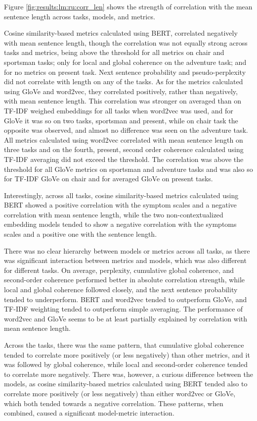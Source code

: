 Figure \ref{fig:results:lm:ru:corr_len} shows the strength of correlation with the mean sentence length across tasks, models, and metrics. 

Cosine similarity-based metrics calculated using BERT, correlated negatively with mean sentence length, though the correlation was not equally strong across tasks and metrics, being above the threshold for all metrics on chair and sportsman tasks; only for local and global coherence on the adventure task; and for no metrics on present task. Next sentence probability and pseudo-perplexity did not correlate with length on any of the tasks. 
As for the metrics calculated using GloVe and word2vec, they correlated positively, rather than negatively, with mean sentence length. This correlation was stronger on averaged than on TF-IDF weighed embeddings for all tasks when word2vec was used, and for GloVe it was so on two tasks, sportsman and present, while on chair task the opposite was observed, and almost no difference was seen on the adventure task. All metrics calculated using word2vec correlated with mean sentence length on three tasks and on the fourth, present, second order coherence calculated using TF-IDF averaging did not exceed the threshold. The correlation was above the threshold for all GloVe metrics on sportsman and adventure tasks and was also so for TF-IDF GloVe on chair and for averaged GloVe on present tasks.

Interestingly, across all tasks, cosine similarity-based metrics calculated using BERT showed a positive correlation with the symptom scales and a negative correlation with mean sentence length, while the two non-contextualized embedding models tended to show a negative correlation with the symptoms scales and a positive one with the sentence length. 

There was no clear hierarchy between models or metrics across all tasks, as there was significant interaction between metrics and models, which was also different for different tasks. On average, perplexity, cumulative global coherence, and second-order coherence performed better in absolute correlation strength, while local and global coherence followed closely, and the next sentence probability tended to underperform. BERT and word2vec tended to outperform GloVe, and TF-IDF weighting tended to outperform simple averaging. The performance of word2vec and GloVe seems to be at least partially explained by correlation with mean sentence length.

Across the tasks, there was the same pattern, that cumulative global coherence tended to correlate more positively (or less negatively) than other metrics, and it was followed by global coherence, while local and second-order coherence tended to correlate more negatively. There was, however, a curious difference between the models, as cosine similarity-based metrics calculated using BERT tended also to correlate more positively (or less negatively) than either word2vec or GloVe, which both tended towards a negative correlation. These patterns, when combined, caused a significant model-metric interaction. 

